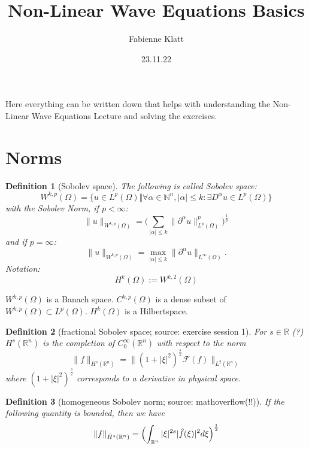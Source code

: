 \documentclass[12pt,a4paper]{article}
\title{Non-Linear Wave Equations Basics}
\author{Fabienne Klatt}
\date{23.11.22}
\newtheorem{definition}{Definition}
\newcommand{\Rn}{\mathbb{R}^n}
\begin{document}
\tableofcontents
\thispagestyle{empty}

\clearpage

Here everything can be written down that helps with understanding the Non-Linear Wave Equations Lecture and solving the exercises.

\section{Norms}

\begin{definition}[Sobolev space]
The following is called Sobolev space:
\begin{equation}
W^{k,p}(\Omega)=\{u\in L^p(\Omega)\Vert \forall\alpha\in\mathbb{N}^n, \vert\alpha\vert\leq k:\exists D^{\alpha}u\in L^p(\Omega)\}
\end{equation}
with the Sobolev Norm, if $p<\infty$:
\begin{equation}
\lVert u\rVert_{W^{k,p}(\Omega)}=\bigl(\sum_{\vert\alpha\vert\leq k} \lVert \partial^{\alpha}u\rVert^p_{L^p(\Omega)}\bigr)^{\frac{1}{p}}
\end{equation}
and if $p=\infty$:
\begin{equation}
\lVert u\rVert_{W^{k,p}(\Omega)}= \max_{\vert\alpha\vert\leq k} \lVert \partial^{\alpha}u\rVert_{L^{\infty}(\Omega)}.
\end{equation}
Notation: 
\begin{equation}
H^k(\Omega):=W^{k,2}(\Omega)
\end{equation}
\end{definition}

$W^{k,p}(\Omega)$ is a Banach space.
$C^{k,p}(\Omega)$ is a dense subset of $W^{k,p}(\Omega)\subset L^p(\Omega)$. $H^k(\Omega)$ is a Hilbertspace.

\begin{definition}[fractional Sobolev space; source: exercise session 1]
For $s\in\mathbb{R}$ (?) $H^s(\mathbb{R}^n)$ is the completion of $C^{\infty}_0(\mathbb{R}^n)$ with respect to the norm
\begin{equation}
\lVert f \rVert_{H^s(\mathbb{R}^n)}=\lVert (1+\lvert\xi\rvert^2)^{\frac{s}{2}}\mathcal{F}(f)\rVert_{L^2(\mathbb{R}^n)}
\end{equation}
where $(1+\lvert\xi\rvert^2)^{\frac{s}{2}}$ corresponds to a derivative in physical space.
\end{definition}

\begin{definition}[homogeneous Sobolev norm; source: mathoverflow(!!)]
If the following quantity is bounded, then we have
\begin{equation}
\lVert f \rVert_{\dot H^s(\Rn)}=\Bigl(\int_{\Rn} \vert \xi\vert^{2s} \vert \hat{f}(\xi)\vert^2 d\xi \Bigr)^{\frac{1}{2}}
\end{equation}
\end{definition}
\end{document}
